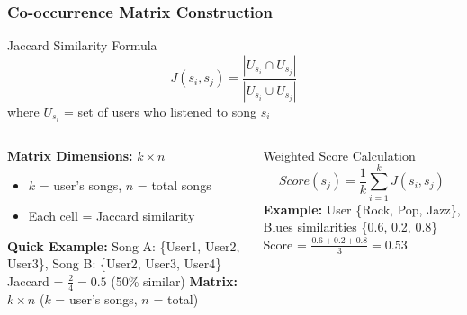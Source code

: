 \documentclass[11pt]{beamer}
\begin{document}
\begin{frame}
\frametitle{Co-occurrence Matrix Construction}
\begin{block}{Jaccard Similarity Formula}
\begin{equation}
J(s_i, s_j) = \frac{|U_{s_i} \cap U_{s_j}|}{|U_{s_i} \cup U_{s_j}|}
\end{equation}
where $U_{s_i}$ = set of users who listened to song $s_i$
\end{block}

\begin{columns}
\begin{column}{0.5\textwidth}
\textbf{Matrix Dimensions:} $k \times n$ 
\begin{itemize}
\item $k$ = user's songs, $n$ = total songs
\item Each cell = Jaccard similarity
\end{itemize}

\textbf{Quick Example:}
\small
Song A: \{User1, User2, User3\}, Song B: \{User2, User3, User4\} \\
Jaccard = $\frac{2}{4} = 0.5$ (50\% similar)
\textbf{Matrix:} $k \times n$ ($k$ = user's songs, $n$ = total)

\end{column}
\begin{column}{0.5\textwidth}


\begin{block}{Weighted Score Calculation}
\begin{equation}
Score(s_j) = \frac{1}{k} \sum_{i=1}^{k} J(s_i, s_j)
\end{equation}
\textbf{Example:} User \{Rock, Pop, Jazz\}, Blues similarities \{0.6, 0.2, 0.8\} \\
Score = $\frac{0.6+0.2+0.8}{3} = 0.53$
\end{block}
\end{column}
\end{columns}
\end{frame}
\end{document}
